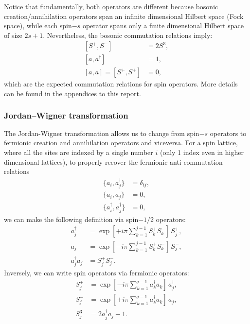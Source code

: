 \documentclass[a4paper]{report}
\begin{document}
\begin{spacing}{1.1}
Notice that fundamentally, both operators are different because bosonic creation/annihilation operators span an infinite dimensional Hilbert space (Fock space), while each spin$-s$ operator spans only a finite dimensional Hilbert space of size $2s+1$. Nevertheless, the bosonic commutation relations imply:
\begin{align}
    \left[ S^+,S^- \right] &= 2S^3,\\
    \left[ a,a^\dagger \right] &= 1,\\
    \left[ a,a \right] = \left[ S^+, S^+ \right] &= 0,
\end{align}
which are the expected commutation relations for spin operators. More details can be found in the appendices to this report.

\subsubsection{Jordan–Wigner transformation}

The Jordan-Wigner transformation allows us to change from spin$-s$ operators to fermionic creation and annihilation operators and viceversa. For a spin lattice, where all the sites are indexed by a single number $i$ (only 1 index even in higher dimensional lattices), to properly recover the fermionic anti-commutation relations
\begin{align}
    \{a_i,a^\dagger_j\} &= \delta_{ij},\\
    \{a_i,a_j\} &= 0,\\
    \{a^\dagger_i,a^\dagger_j\} &= 0,
\end{align}
we can make the following definition via spin$-1/2$ operators:
\begin{align}
    a^\dagger_j &= \exp[+i\pi \sum_{k=1}^{j-1} S_k^+S_k^-] \, S_j^+,\\
    a_j &= \exp[-i\pi \sum_{k=1}^{j-1} S_k^+S_k^-] \, S_j^-,\\
    a^\dagger_j a_j &= S_j^+ S_j^-.
\end{align}
Inversely, we can write spin operators via fermionic operators:
\begin{align}
    S_j^+ &= \exp[-i\pi \sum_{k=1}^{j-1} a_k^\dagger a_k] \, a_j^\dagger,\\
    S_j^- &= \exp[+i\pi \sum_{k=1}^{j-1} a_k^\dagger a_k] \, a_j,\\
    S_j^3 &= 2a_j^\dagger a_j - 1.
\end{align}


\end{spacing}
\end{document}
